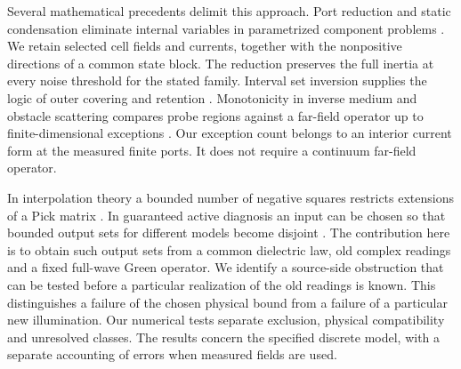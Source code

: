 \documentclass[anonymous,12pt]{iopjournal}
\numberwithin{equation}{section}
\begin{document}
Several mathematical precedents delimit this approach. Port reduction and static condensation eliminate internal variables in parametrized component problems \cite{huynh}. We retain selected cell fields and currents, together with the nonpositive directions of a common state block. The reduction preserves the full inertia at every noise threshold for the stated family. Interval set inversion supplies the logic of outer covering and retention \cite{sivia}. Monotonicity in inverse medium and obstacle scattering compares probe regions against a far-field operator up to finite-dimensional exceptions \cite{griesmaier_harrach,griesmaier_harrach_erratum,albicker}. Our exception count belongs to an interior current form at the measured finite ports. It does not require a continuum far-field operator.

In interpolation theory a bounded number of negative squares restricts extensions of a Pick matrix \cite{pick}. In guaranteed active diagnosis an input can be chosen so that bounded output sets for different models become disjoint \cite{scott}. The contribution here is to obtain such output sets from a common dielectric law, old complex readings and a fixed full-wave Green operator. We identify a source-side obstruction that can be tested before a particular realization of the old readings is known. This distinguishes a failure of the chosen physical bound from a failure of a particular new illumination. Our numerical tests separate exclusion, physical compatibility and unresolved classes. The results concern the specified discrete model, with a separate accounting of errors when measured fields are used.







\end{document}
